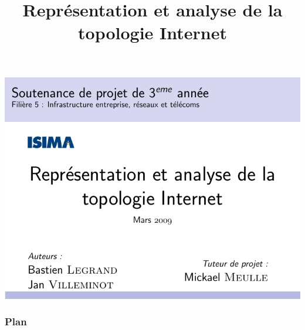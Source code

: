 \documentclass{beamer}
\title{Repr\'esentation et analyse de la topologie Internet}
\date{\oldstylenums{20 mars 2009}}
\begin{document}
\hspace{-0.242\textwidth}
\begin{frame}[tc, plain]
 
 \includegraphics{titre.pdf}
\end{frame}




\begin{frame}[tc]
 \frametitle{Plan}
 \tableofcontents
\end{frame}









\end{document}
